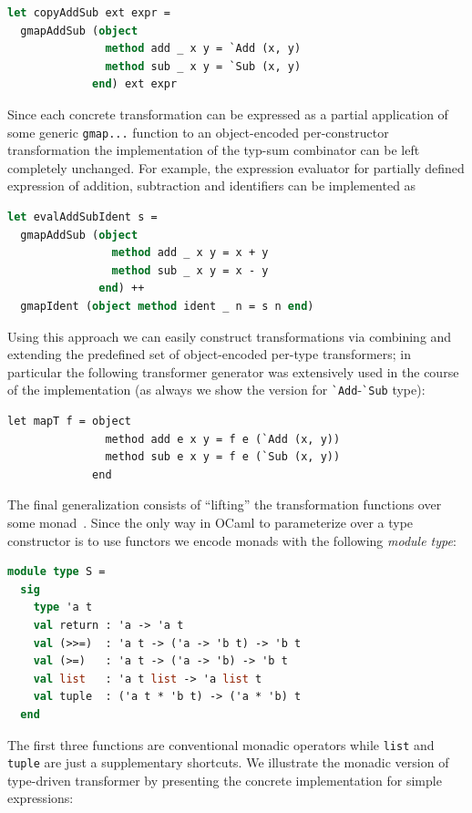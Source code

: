 \begin{lstlisting}[language=ocaml]
let copyAddSub ext expr =
  gmapAddSub (object
               method add _ x y = `Add (x, y)
               method sub _ x y = `Sub (x, y)
             end) ext expr
\end{lstlisting}

Since each concrete transformation can be expressed as a partial application of
some generic \lstinline{gmap...} function to an object-encoded per-constructor
transformation the implementation of the typ-sum combinator can be left completely 
unchanged. For example, the expression evaluator for partially defined expression
of addition, subtraction and identifiers can be implemented as

\begin{lstlisting}[language=ocaml]
let evalAddSubIdent s = 
  gmapAddSub (object
                method add _ x y = x + y
                method sub _ x y = x - y
              end) ++
  gmapIdent (object method ident _ n = s n end)
\end{lstlisting}

Using this approach we can easily construct transformations via combining and
extending the predefined set of object-encoded per-type transformers; in 
particular the following transformer generator was extensively used in the course
of the implementation (as always we show the version for \lstinline{`Add}-\lstinline{`Sub}
type):

\begin{lstlisting}
let mapT f = object
               method add e x y = f e (`Add (x, y))
               method sub e x y = f e (`Sub (x, y))
             end
\end{lstlisting}

The final generalization consists of ``lifting'' the transformation functions
over some monad~\cite{Monads}. Since the only way in OCaml to parameterize over a
type constructor is to use functors we encode monads with the following \emph{module type}:

\begin{lstlisting}[language=ocaml]
module type S = 
  sig
    type 'a t
    val return : 'a -> 'a t
    val (>>=)  : 'a t -> ('a -> 'b t) -> 'b t
    val (>=)   : 'a t -> ('a -> 'b) -> 'b t
    val list   : 'a t list -> 'a list t
    val tuple  : ('a t * 'b t) -> ('a * 'b) t 
  end
\end{lstlisting}

The first three functions are conventional monadic operators while \lstinline{list} and
\lstinline{tuple} are just a supplementary shortcuts. We illustrate the monadic version of 
type-driven transformer by presenting the concrete implementation for simple expressions:

